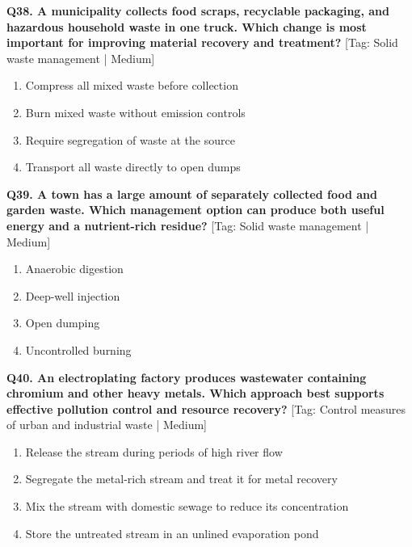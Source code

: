 \noindent\textbf{Q38. A municipality collects food scraps, recyclable packaging, and hazardous household waste in one truck. Which change is most important for improving material recovery and treatment?} \hfill [Tag: Solid waste management | Medium]
\begin{enumerate}[label=(\alph*),topsep=2pt,itemsep=1pt,partopsep=0pt,parsep=0pt]
    \item {Compress all mixed waste before collection}
    \item {Burn mixed waste without emission controls}
    \item {Require segregation of waste at the source}
    \item {Transport all waste directly to open dumps}
\end{enumerate}
\vspace{2mm}

\noindent\textbf{Q39. A town has a large amount of separately collected food and garden waste. Which management option can produce both useful energy and a nutrient-rich residue?} \hfill [Tag: Solid waste management | Medium]
\begin{enumerate}[label=(\alph*),topsep=2pt,itemsep=1pt,partopsep=0pt,parsep=0pt]
    \item {Anaerobic digestion}
    \item {Deep-well injection}
    \item {Open dumping}
    \item {Uncontrolled burning}
\end{enumerate}
\vspace{2mm}

\noindent\textbf{Q40. An electroplating factory produces wastewater containing chromium and other heavy metals. Which approach best supports effective pollution control and resource recovery?} \hfill [Tag: Control measures of urban and industrial waste | Medium]
\begin{enumerate}[label=(\alph*),topsep=2pt,itemsep=1pt,partopsep=0pt,parsep=0pt]
    \item {Release the stream during periods of high river flow}
    \item {Segregate the metal-rich stream and treat it for metal recovery}
    \item {Mix the stream with domestic sewage to reduce its concentration}
    \item {Store the untreated stream in an unlined evaporation pond}
\end{enumerate}
\vspace{2mm}


